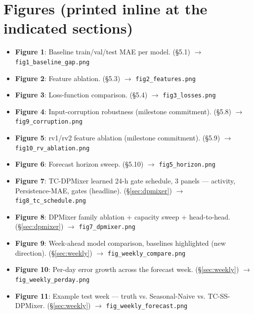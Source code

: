 \documentclass[11pt,letterpaper]{article}
\begin{document}
\section*{Figures (printed inline at the indicated sections)}

\begin{itemize}[leftmargin=*,itemsep=1pt]
  \item \textbf{Figure 1}: Baseline train/val/test MAE per model. (\S5.1)
        $\rightarrow$ \texttt{fig1\_baseline\_gap.png}
  \item \textbf{Figure 2}: Feature ablation. (\S5.3)
        $\rightarrow$ \texttt{fig2\_features.png}
  \item \textbf{Figure 3}: Loss-function comparison. (\S5.4)
        $\rightarrow$ \texttt{fig3\_losses.png}
  \item \textbf{Figure 4}: Input-corruption robustness (milestone
        commitment). (\S5.8) $\rightarrow$ \texttt{fig9\_corruption.png}
  \item \textbf{Figure 5}: rv1/rv2 feature ablation (milestone
        commitment). (\S5.9) $\rightarrow$ \texttt{fig10\_rv\_ablation.png}
  \item \textbf{Figure 6}: Forecast horizon sweep. (\S5.10)
        $\rightarrow$ \texttt{fig5\_horizon.png}
  \item \label{fig:tc-schedule} \textbf{Figure 7}: TC-DPMixer learned 24-h
        gate schedule, 3 panels --- activity, Persistence-MAE, gates
        (headline). (\S\ref{sec:dpmixer})
        $\rightarrow$ \texttt{fig8\_tc\_schedule.png}
  \item \textbf{Figure 8}: DPMixer family ablation + capacity sweep +
        head-to-head. (\S\ref{sec:dpmixer})
        $\rightarrow$ \texttt{fig7\_dpmixer.png}
  \item \label{fig:weekly-compare} \textbf{Figure 9}: Week-ahead model
        comparison, baselines highlighted (new direction).
        (\S\ref{sec:weekly}) $\rightarrow$ \texttt{fig\_weekly\_compare.png}
  \item \label{fig:weekly-perday} \textbf{Figure 10}: Per-day error growth
        across the forecast week. (\S\ref{sec:weekly})
        $\rightarrow$ \texttt{fig\_weekly\_perday.png}
  \item \label{fig:weekly-forecast} \textbf{Figure 11}: Example test week
        --- truth vs. Seasonal-Naive vs. TC-SS-DPMixer. (\S\ref{sec:weekly})
        $\rightarrow$ \texttt{fig\_weekly\_forecast.png}
\end{itemize}
\end{document}
